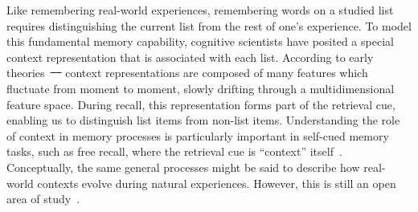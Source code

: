 \documentclass[11pt]{article}
\providecommand{\DIFaddtex}[1]{{\protect\color{blue}\uwave{#1}}} %
\providecommand{\DIFdeltex}[1]{{\protect\color{red}\sout{#1}}}                      %
\providecommand{\DIFaddbegin}{} %
\providecommand{\DIFaddend}{} %
\providecommand{\DIFdelbegin}{} %
\providecommand{\DIFdelend}{} %
\providecommand{\DIFadd}[1]{\texorpdfstring{\DIFaddtex{#1}}{#1}} %
\providecommand{\DIFdel}[1]{\texorpdfstring{\DIFdeltex{#1}}{}} %
\newcommand{\DIFscaledelfig}{0.5}
\newlength{\DIFdelgraphicswidth} %
\newlength{\DIFdelgraphicsheight} %
\newcommand{\DIFaddincludegraphics}[2][]{{\color{blue}\fbox{\DIFOincludegraphics[#1]{#2}}}} %
\newcommand{\DIFdelincludegraphics}[2][]{%
\sbox{\DIFdelgraphicsbox}{\DIFOincludegraphics[#1]{#2}}%
\settoboxwidth{\DIFdelgraphicswidth}{\DIFdelgraphicsbox} %
\settoboxtotalheight{\DIFdelgraphicsheight}{\DIFdelgraphicsbox} %
\scalebox{\DIFscaledelfig}{%
\parbox[b]{\DIFdelgraphicswidth}{\usebox{\DIFdelgraphicsbox}\\[-\baselineskip] \rule{\DIFdelgraphicswidth}{0em}}\llap{\resizebox{\DIFdelgraphicswidth}{\DIFdelgraphicsheight}{%
\setlength{\unitlength}{\DIFdelgraphicswidth}%
\begin{picture}(1,1)%
\thicklines\linethickness{2pt} %
{\color[rgb]{1,0,0}\put(0,0){\framebox(1,1){}}}%
{\color[rgb]{1,0,0}\put(0,0){\line( 1,1){1}}}%
{\color[rgb]{1,0,0}\put(0,1){\line(1,-1){1}}}%
\end{picture}%
}\hspace*{3pt}}} %
} %
\DeclareRobustCommand{\DIFaddbegin}{\DIFOaddbegin \let\includegraphics\DIFaddincludegraphics} %
\DeclareRobustCommand{\DIFaddend}{\DIFOaddend \let\includegraphics\DIFOincludegraphics} %
\DeclareRobustCommand{\DIFdelbegin}{\DIFOdelbegin \let\includegraphics\DIFdelincludegraphics} %
\DeclareRobustCommand{\DIFdelend}{\DIFOaddend \let\includegraphics\DIFOincludegraphics} %
\begin{document}
Like remembering real-world experiences, remembering words on a studied list
requires distinguishing the current list from the rest of one's experience. To
model this fundamental memory capability, cognitive scientists have posited a
special context representation that is associated with each list. According to
early theories~\DIFdelbegin \DIFdel{\mbox{%
\citep[e.g.][]{Este55a,AndeBowe72} }\hskip0pt%
}\DIFdelend \DIFaddbegin \DIFadd{\mbox{%
\citep[e.g.,][]{Este55a,AndeBowe72} }\hskip0pt%
}\DIFaddend context representations are
composed of many features which fluctuate from moment to moment, slowly
drifting through a multidimensional feature space. During recall, this
representation forms part of the retrieval cue, enabling us to distinguish list
items from non-list items. Understanding the role of context in memory
processes is particularly important in self-cued memory tasks, such as free
recall, where the retrieval cue is ``context'' itself~\citep{HowaKaha02a}.
Conceptually, the same general processes might be said to describe how
real-world contexts evolve during natural experiences. However, this is still
an open area of study~\citep{Mann20, Mann21a}.
\end{document}
